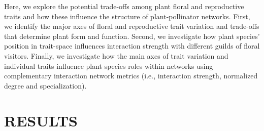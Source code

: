 \documentclass[12pt,a4paper,]{article}
\begin{document}
Here, we explore the potential trade-offs among plant floral and
reproductive traits and how these influence the structure of
plant-pollinator networks. First, we identify the major axes of floral
and reproductive trait variation and trade-offs that determine plant
form and function. Second, we investigate how plant species' position in
trait-space influences interaction strength with different guilds of
floral visitors. Finally, we investigate how the main axes of trait
variation and individual traits influence plant species roles within
networks using complementary interaction network metrics (i.e.,
interaction strength, normalized degree and specialization).

\section{RESULTS}\label{results}
\end{document}
